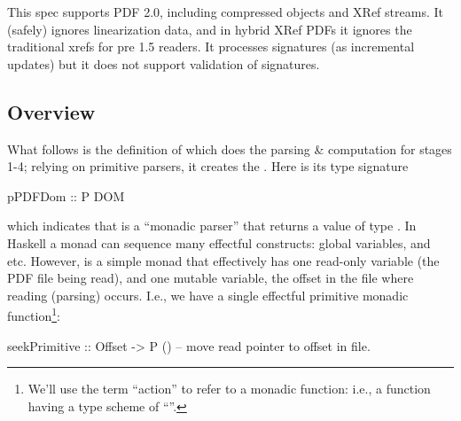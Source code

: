 This spec supports PDF 2.0, including compressed objects and XRef streams.
%
It (safely) ignores linearization data, and in hybrid XRef PDFs
it ignores the traditional xrefs for pre 1.5 readers.
It processes signatures (as incremental updates) but it does not support
validation of signatures.


\subsection{Overview}

\iffalse
\begin{code}
{-# LANGUAGE EmptyDataDecls, TypeOperators, LambdaCase #-}
module Spec where
import           Control.Monad
import           Data.Char
import           Data.Foldable(foldlM)
import qualified Data.IntSet as IntSet
import qualified Data.Map as M
import           Data.Map(Map)
import           Types
import           Utils
import           Primitives
import           Streams
\end{code}
\fi

What follows is the definition of  which does the
parsing \& computation for stages 1-4;
relying on primitive parsers, it creates the .
Here is its type signature
\begin{code}
pPDFDom :: P DOM
\end{code}
which indicates that
 is a ``monadic parser''  that returns a
value of type .
In Haskell a monad can sequence many effectful constructs: global variables,
and etc. However,  is a simple monad that effectively has one
read-only variable (the PDF file being read), and one mutable variable,
the offset in the file where reading (parsing) occurs.  I.e., we have
a single effectful primitive monadic function\footnote{
  We'll use the term ``action'' to refer to a monadic function:
  i.e., a function having a type scheme of ``''.
}:
\begin{codeNoExecute}
seekPrimitive :: Offset -> P () -- move read pointer to offset in file.
\end{codeNoExecute}

